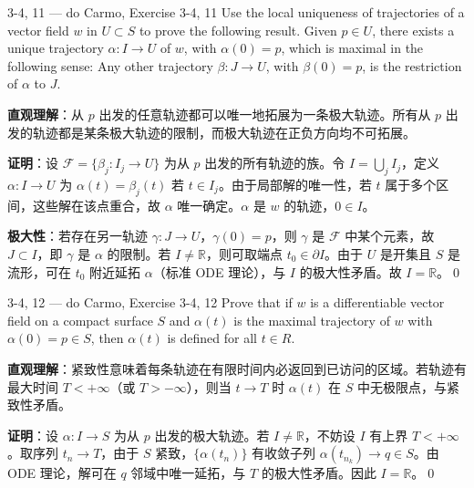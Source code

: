 \begin{exercise}{3-4, 11 — do Carmo, Exercise 3-4, 11}
Use the local uniqueness of trajectories of a vector field $w$ in $U \subset S$ to prove the following result. Given $p \in U$, there exists a unique trajectory $\alpha: I \to U$ of $w$, with $\alpha(0) = p$, which is maximal in the following sense: Any other trajectory $\beta: J \to U$, with $\beta(0) = p$, is the restriction of $\alpha$ to $J$.
\end{exercise}
\begin{solution}
\textbf{直观理解}：从 $p$ 出发的任意轨迹都可以唯一地拓展为一条极大轨迹。所有从 $p$ 出发的轨迹都是某条极大轨迹的限制，而极大轨迹在正负方向均不可拓展。

\textbf{证明}：设 $\mathcal{F} = \{\beta_j\colon I_j\to U\}$ 为从 $p$ 出发的所有轨迹的族。令 $I = \bigcup_j I_j$，定义 $\alpha\colon I\to U$ 为 $\alpha(t) = \beta_j(t)$ 若 $t\in I_j$。由于局部解的唯一性，若 $t$ 属于多个区间，这些解在该点重合，故 $\alpha$ 唯一确定。$\alpha$ 是 $w$ 的轨迹，$0\in I$。

\textbf{极大性}：若存在另一轨迹 $\gamma\colon J\to U$，$\gamma(0)=p$，则 $\gamma$ 是 $\mathcal{F}$ 中某个元素，故 $J\subset I$，即 $\gamma$ 是 $\alpha$ 的限制。若 $I \neq \mathbb{R}$，则可取端点 $t_0 \in \partial I$。由于 $U$ 是开集且 $S$ 是流形，可在 $t_0$ 附近延拓 $\alpha$（标准 ODE 理论），与 $I$ 的极大性矛盾。故 $I = \mathbb{R}$。\qed
\end{solution}

\begin{exercise}{3-4, 12 — do Carmo, Exercise 3-4, 12}
Prove that if $w$ is a differentiable vector field on a compact surface $S$ and $\alpha(t)$ is the maximal trajectory of $w$ with $\alpha(0) = p \in S$, then $\alpha(t)$ is defined for all $t \in R$.
\end{exercise}
\begin{solution}
\textbf{直观理解}：紧致性意味着每条轨迹在有限时间内必返回到已访问的区域。若轨迹有最大时间 $T < +\infty$（或 $T > -\infty$），则当 $t\to T$ 时 $\alpha(t)$ 在 $S$ 中无极限点，与紧致性矛盾。

\textbf{证明}：设 $\alpha\colon I\to S$ 为从 $p$ 出发的极大轨迹。若 $I \neq \mathbb{R}$，不妨设 $I$ 有上界 $T < +\infty$。取序列 $t_n \to T$，由于 $S$ 紧致，$\{\alpha(t_n)\}$ 有收敛子列 $\alpha(t_{n_k}) \to q \in S$。由 ODE 理论，解可在 $q$ 邻域中唯一延拓，与 $T$ 的极大性矛盾。因此 $I = \mathbb{R}$。\qed
\end{solution}

